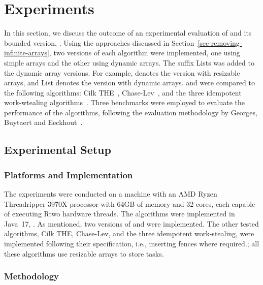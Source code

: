 \section{\label{sec-experiments}Experiments}

In this section, we discuss the outcome of an experimental evaluation of \NCWSM and its bounded version, \BNCWSM.  Using the approaches discussed in Section~\ref{sec-removing-infinite-arrays}, two versions of each algorithm were implemented, one using simple arrays and the other using dynamic arrays. The suffix Lists was added to the dynamic array versions. For example, \NCWSM denotes the version with resizable arrays, and \NCWSM List denotes the version with dynamic arrays.  \NCWSM and \BNCWSM were compared to the following algorithms: Cilk THE~\cite{DBLP_conf_pldi_FrigoLR98}, Chase-Lev~\cite{circular.work.stealing}, and the three idempotent work-wtealing algorithms~\cite{maged.vechev.2009}.  Three benchmarks were employed to evaluate the performance of the algorithms, following the evaluation methodology by Georges, Buytaert and Eeckhout~\cite{DBLP_conf_oopsla_GeorgesBE07}.

\subsection{\label{subsec-experimental-setup}Experimental Setup}

\subsubsection{\label{subsec:implementation}Platforms and Implementation}

The experiments were conducted on a machine with an AMD Ryzen Threadripper 3970X processor with 64GB of memory and 32 cores, each capable of executing Rtwo hardware threads. The algorithms were implemented in Java~17, .  As mentioned, two versions of \NCWSM and \BNCWSM were implemented. The other tested algorithms, Cilk THE, Chase-Lev, and the three idempotent work-stealing, were implemented following their specification, i.e., inserting fences where required.; all these algorithms use resizable arrays to store tasks.

\subsubsection{\label{subsec:methodology}Methodology}

